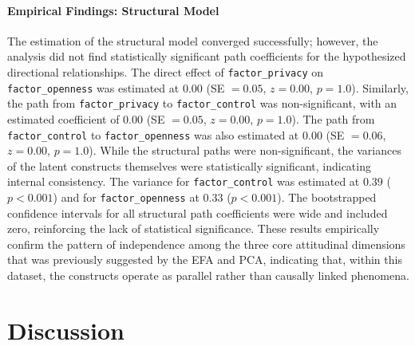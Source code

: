 		\paragraph{Empirical Findings: Structural Model}
		The estimation of the structural model converged successfully; however, the analysis did not find statistically significant path coefficients for the hypothesized directional relationships. The direct effect of \texttt{factor\_privacy} on \texttt{factor\_openness} was estimated at $0.00$ (SE $= 0.05$, $z = 0.00$, $p = 1.0$). Similarly, the path from \texttt{factor\_privacy} to \texttt{factor\_control} was non-significant, with an estimated coefficient of $0.00$ (SE $= 0.05$, $z = 0.00$, $p = 1.0$). The path from \texttt{factor\_control} to \texttt{factor\_openness} was also estimated at $0.00$ (SE $= 0.06$, $z = 0.00$, $p = 1.0$).
		While the structural paths were non-significant, the variances of the latent constructs themselves were statistically significant, indicating internal consistency. The variance for \texttt{factor\_control} was estimated at $0.39$ ($p < 0.001$) and for \texttt{factor\_openness} at $0.33$ ($p < 0.001$). The bootstrapped confidence intervals for all structural path coefficients were wide and included zero, reinforcing the lack of statistical significance. These results empirically confirm the pattern of independence among the three core attitudinal dimensions that was previously suggested by the EFA and PCA, indicating that, within this dataset, the constructs operate as parallel rather than causally linked phenomena.

\section{Discussion}
